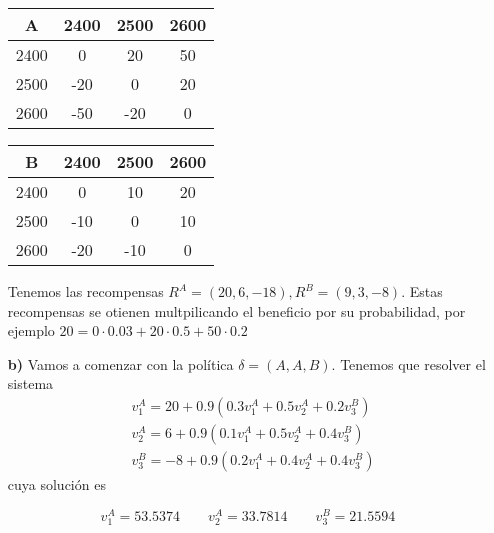\documentclass[twoside]{article}
\begin{document}
\begin{ejercicio}{3}
\begin{solucion}
\begin{itemize}
\begin{tabular}{c|ccc}
A & 2400 & 2500 & 2600\\
\hline
2400 & 0 & 20 & 50\\
2500 & -20 & 0 & 20\\
2600 & -50 & -20 & 0
\end{tabular}\quad
\begin{tabular}{c|ccc}
B & 2400 & 2500 & 2600\\
\hline
2400 & 0 & 10 & 20\\
2500 & -10 & 0 & 10\\
2600 & -20 & -10 & 0
\end{tabular}

Tenemos las recompensas  $R^A=(20,6,-18), R^B=(9,3,-8)$. Estas recompensas se otienen multpilicando el beneficio por su probabilidad, por ejemplo $20=0\cdot 0.03+20\cdot 0.5+50\cdot 0.2$
\item[\textbf{b)}] Vamos a comenzar con la política $\delta=(A,A,B)$. Tenemos que resolver el sistema
\begin{align*}
&v^A_1=20+0.9(0.3v^A_1+0.5v^A_2+0.2v^B_3)\\
&v^A_2=6+0.9(0.1v^A_1+0.5v^A_2+0.4v^B_3)\\
&v^B_3=-8+0.9(0.2v^A_1+0.4v^A_2+0.4v^B_3)
\end{align*}
cuya solución es 

$$v^A_1=53.5374\qquad v^A_2=33.7814\qquad v^B_3=21.5594$$


\end{itemize}
\end{solucion}
\end{ejercicio}
\end{document}
